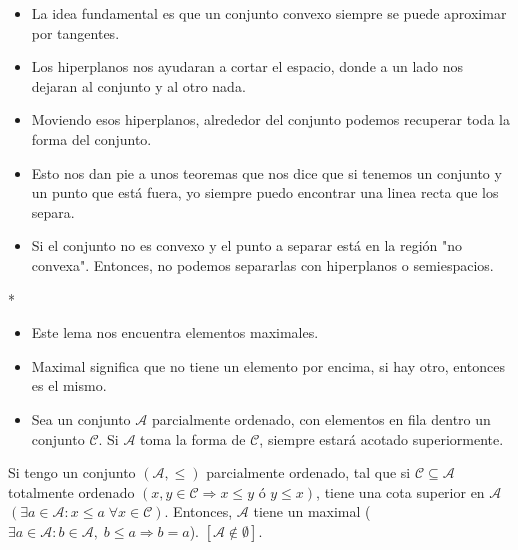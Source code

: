 \begin{paracol}{2}
{    \begin{center}
    \end{center}
}
\switchcolumn[0]\noindent
\begin{tcolorbox}[colframe=white]
    \begin{itemize}
	\item La idea fundamental es que un conjunto convexo siempre se puede aproximar por tangentes.
	\item Los hiperplanos nos ayudaran a cortar el espacio, donde a un lado nos dejaran al conjunto y al otro nada.
	\item Moviendo esos hiperplanos, alrededor del conjunto podemos recuperar toda la forma del conjunto.
	\item Esto nos dan pie a unos teoremas que nos dice que si tenemos un conjunto y un punto que está fuera, yo siempre puedo encontrar una linea recta que los separa.
	\item Si el conjunto no es convexo y el punto a separar está en la región "no convexa". Entonces, no podemos separarlas con hiperplanos o semiespacios.
    \end{itemize}
\end{tcolorbox}

\switchcolumn[1]*{\noindent\scriptsize
\begin{itemize}
    \item Este lema nos encuentra elementos maximales. 
    \item Maximal significa que no tiene un elemento por encima, si hay otro, entonces es el mismo.
    \item Sea un conjunto $\mathscr{A}$ parcialmente ordenado, con elementos en fila dentro un conjunto $\mathscr{C}$. Si $\mathscr{A}$ toma la forma de $\mathscr{C}$, siempre estará acotado superiormente. 
\end{itemize}
}
\switchcolumn[0]\noindent
\begin{lema} Si tengo un conjunto $\left(\mathscr{A},\leq\right)$ parcialmente ordenado, tal que si $\mathscr{C} \subseteq \mathscr{A}$ totalmente ordenado $\left(x,y \in \mathscr{C} \Rightarrow x\leq y \text{ ó } y\leq x\right)$, tiene una cota superior en $\mathscr{A}$ $\left(\exists a\in \mathscr{A}:x\leq a \;\forall x\in \mathscr{C}\right)$. Entonces, $\mathscr{A}$ tiene un maximal ($\exists a \in \mathscr{A}: b \in \mathscr{A},\; b\leq a \Rightarrow b=a$). $\left[\mathscr{A}\notin \emptyset\right]$.
\end{lema}



\end{paracol}
